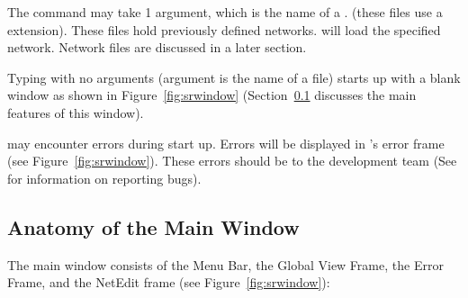 The  command may take 1 argument, which is the name of
a .  (these files use a 
extension).  These files hold previously defined \sr{} networks.
\sr{} will load the specified network.  Network files are discussed in
a later section.

Typing  with no arguments (argument is the name of a
\sr{} file) starts up \sr{} with a blank
\sr{} window as shown in Figure~\ref{fig:srwindow}
(Section~\ref{sec:windowanatomy} discusses the main features of this
window).

\sr{} may encounter errors during start up.  Errors will be displayed in
\sr{}'s error frame (see Figure~\ref{fig:srwindow}).  These errors
should be  to the \sr{} development
team (See  for information on
reporting bugs).

\subsection{Anatomy of the Main Window}
\label{sec:windowanatomy}

The \sr{} main window consists of the Menu Bar, the Global View Frame,
the Error Frame, and the NetEdit frame (see
Figure~\ref{fig:srwindow}):

